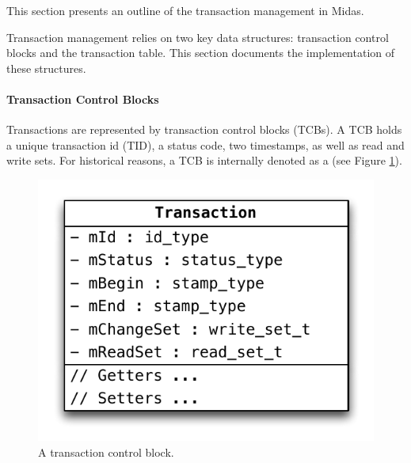 This section presents an outline of the transaction management in Midas.


Transaction management relies on two key data structures: transaction control blocks and the transaction table. This section documents the implementation of these structures.


\paragraph{Transaction Control Blocks}

Transactions are represented by transaction control blocks (TCBs). A TCB holds a unique transaction id (TID), a status code, two timestamps, as well as read and write sets. For historical reasons, a TCB is internally denoted as a  (see Figure \ref{fig:tcb}).

\begin{figure}[h!]
    \centering
    \includegraphics[scale=.75]{figures/impl/tx.pdf}
    \caption{A transaction control block.}
    \label{fig:tcb}
\end{figure}

